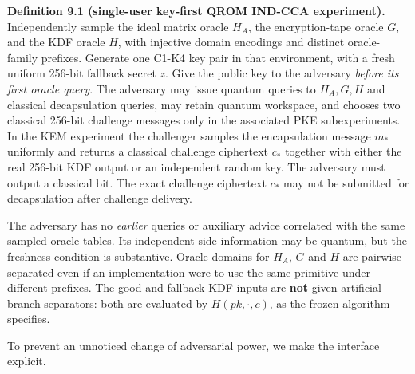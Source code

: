 \documentclass[
  11pt,
  a4paper,
  oneside]{report}
\begin{document}
\textbf{Definition 9.1 (single-user key-first QROM IND-CCA experiment).}
Independently sample the ideal matrix oracle \(H_A\), the
encryption-tape oracle \(G\), and the KDF oracle \(H\), with injective
domain encodings and distinct oracle-family prefixes. Generate one C1-K4
key pair in that environment, with a fresh uniform 256-bit fallback
secret \(z\). Give the public key to the adversary \emph{before its
first oracle query}. The adversary may issue quantum queries to
\(H_A,G,H\) and classical decapsulation queries, may retain quantum
workspace, and chooses two classical 256-bit challenge messages only in
the associated PKE subexperiments. In the KEM experiment the challenger
samples the encapsulation message \(m_*\) uniformly and returns a
classical challenge ciphertext \(c_*\) together with either the real
256-bit KDF output or an independent random key. The adversary must
output a classical bit. The exact challenge ciphertext \(c_*\) may not
be submitted for decapsulation after challenge delivery.

The adversary has no \emph{earlier} queries or auxiliary advice
correlated with the same sampled oracle tables. Its independent side
information may be quantum, but the freshness condition is substantive.
Oracle domains for \(H_A\), \(G\) and \(H\) are pairwise separated even
if an implementation were to use the same primitive under different
prefixes. The good and fallback KDF inputs are \textbf{not} given
artificial branch separators: both are evaluated by \(H(pk,\cdot,c)\),
as the frozen algorithm specifies.

To prevent an unnoticed change of adversarial power, we make the
interface explicit.
\end{document}
